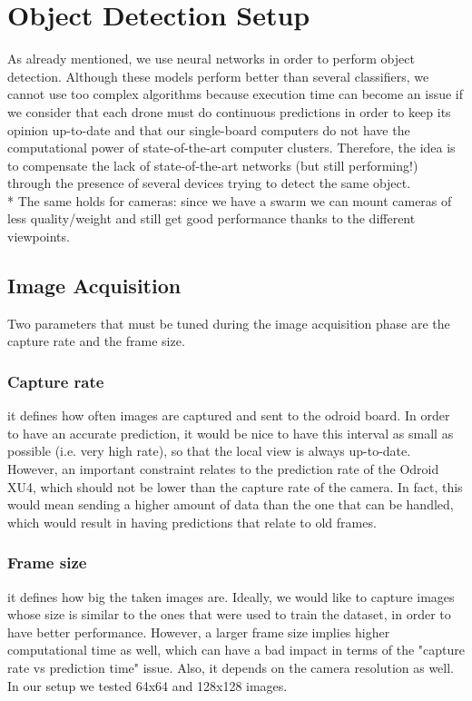 \documentclass[10pt,conference,compsocconf]{IEEEtran}
\begin{document}
\section{Object Detection Setup}
As already mentioned, we use neural networks in order to perform object detection. Although these models perform better than several classifiers, we cannot use too complex algorithms because execution time can become an issue if we consider that each drone must do continuous predictions in order to keep its opinion up-to-date and that our single-board computers do not have the computational power of state-of-the-art computer clusters. Therefore, the idea is to compensate the lack of state-of-the-art networks (but still performing!) through the presence of several devices trying to detect the same object.\\*
The same holds for cameras: since we have a swarm we can mount cameras of less quality/weight and still get good performance thanks to the different viewpoints.
\subsection{Image Acquisition}
Two parameters that must be tuned during the image acquisition phase are the capture rate and the frame size.
\subsubsection{Capture rate} it defines how often images are captured and sent to the odroid board. In order to have an accurate prediction, it would be nice to have this interval as small as possible (i.e. very high rate), so that the local view is always up-to-date.
However, an important constraint relates to the prediction rate of the Odroid XU4, which should not be lower than the capture rate of the camera. In fact, this would mean sending a higher amount of data than the one that can be handled, which would result in having predictions that relate to old frames.
\subsubsection{Frame size} it defines how big the taken images are. Ideally, we would like to capture images whose size is similar to the ones that were used to train the dataset, in order to have better performance. However, a larger frame size implies higher computational time as well, which can have a bad impact in terms of the "capture rate vs prediction time" issue. Also, it depends on the camera resolution as well.
In our setup we tested 64x64 and 128x128 images.
\end{document}
